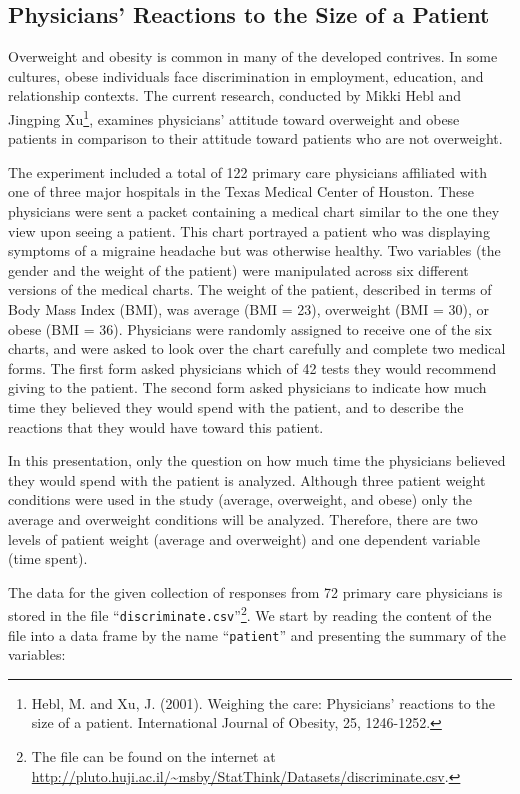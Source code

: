 \documentclass[
]{krantz}
\theoremstyle{definition}
\theoremstyle{definition}
\theoremstyle{definition}
\theoremstyle{remark}
\begin{document}
\hypertarget{physicians-reactions-to-the-size-of-a-patient}{%
\subsection{Physicians' Reactions to the Size of a Patient}\label{physicians-reactions-to-the-size-of-a-patient}}

Overweight and obesity is common in many of the developed contrives. In
some cultures, obese individuals face discrimination in employment,
education, and relationship contexts. The current research, conducted by
Mikki Hebl and Jingping Xu\footnote{Hebl, M. and Xu, J. (2001). Weighing the care: Physicians'
  reactions to the size of a patient. International Journal of
  Obesity, 25, 1246-1252.}, examines physicians' attitude toward
overweight and obese patients in comparison to their attitude toward
patients who are not overweight.

The experiment included a total of 122 primary care physicians
affiliated with one of three major hospitals in the Texas Medical Center
of Houston. These physicians were sent a packet containing a medical
chart similar to the one they view upon seeing a patient. This chart
portrayed a patient who was displaying symptoms of a migraine headache
but was otherwise healthy. Two variables (the gender and the weight of
the patient) were manipulated across six different versions of the
medical charts. The weight of the patient, described in terms of Body
Mass Index (BMI), was average (BMI = 23), overweight (BMI = 30), or
obese (BMI = 36). Physicians were randomly assigned to receive one of
the six charts, and were asked to look over the chart carefully and
complete two medical forms. The first form asked physicians which of 42
tests they would recommend giving to the patient. The second form asked
physicians to indicate how much time they believed they would spend with
the patient, and to describe the reactions that they would have toward
this patient.

In this presentation, only the question on how much time the physicians
believed they would spend with the patient is analyzed. Although three
patient weight conditions were used in the study (average, overweight,
and obese) only the average and overweight conditions will be analyzed.
Therefore, there are two levels of patient weight (average and
overweight) and one dependent variable (time spent).

The data for the given collection of responses from 72 primary care
physicians is stored in the file ``\texttt{discriminate.csv}''\footnote{The file can be found on the internet at
  \url{http://pluto.huji.ac.il/~msby/StatThink/Datasets/discriminate.csv}.}. We start by
reading the content of the file into a data frame by the name
``\texttt{patient}'' and presenting the summary of the variables:
\end{document}

